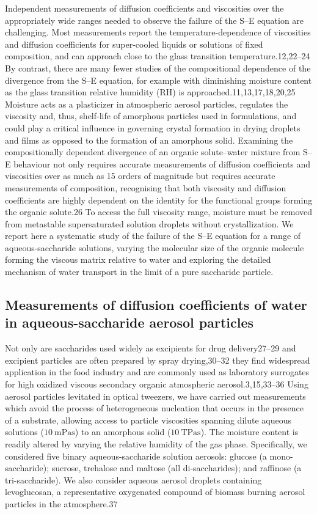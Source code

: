 Independent measurements of diffusion coefficients and viscosities over the appropriately wide ranges needed to observe the failure of the S–E equation are challenging. Most measurements report the temperature-dependence of viscosities and diffusion coefficients for super-cooled liquids or solutions of fixed composition, and can approach close to the glass transition temperature.12,22–24 By contrast, there are many fewer studies of the compositional dependence of the divergence from the S–E equation, for example with diminishing moisture content as the glass transition relative humidity (RH) is approached.11,13,17,18,20,25 Moisture acts as a plasticizer in atmospheric aerosol particles, regulates the viscosity and, thus, shelf-life of amorphous particles used in formulations, and could play a critical influence in governing crystal formation in drying droplets and films as opposed to the formation of an amorphous solid. Examining the compositionally dependent divergence of an organic solute–water mixture from S–E behaviour not only requires accurate measurements of diffusion coefficients and viscosities over as much as 15 orders of magnitude but requires accurate measurements of composition, recognising that both viscosity and diffusion coefficients are highly dependent on the identity for the functional groups forming the organic solute.26 To access the full viscosity range, moisture must be removed from metastable supersaturated solution droplets without crystallization. We report here a systematic study of the failure of the S–E equation for a range of aqueous-saccharide solutions, varying the molecular size of the organic molecule forming the viscous matrix relative to water and exploring the detailed mechanism of water transport in the limit of a pure saccharide particle.

\subsection{Measurements of diffusion coefficients of water in aqueous-saccharide aerosol particles}

Not only are saccharides used widely as excipients for drug delivery27–29 and excipient particles are often prepared by spray drying,30–32 they find widespread application in the food industry and are commonly used as laboratory surrogates for high oxidized viscous secondary organic atmospheric aerosol.3,15,33–36 Using aerosol particles levitated in optical tweezers, we have carried out measurements which avoid the process of heterogeneous nucleation that occurs in the presence of a substrate, allowing access to particle viscosities spanning dilute aqueous solutions ($\SI{10}{\milli\pascal\second}$) to an amorphous solid ($\SI{10}{\tera\pascal\second}$). The moisture content is readily altered by varying the relative humidity of the gas phase. Specifically, we considered five binary aqueous-saccharide solution aerosols: glucose (a mono-saccharide); sucrose, trehalose and maltose (all di-saccharides); and raffinose (a tri-saccharide). We also consider aqueous aerosol droplets containing levoglucosan, a representative oxygenated compound of biomass burning aerosol particles in the atmosphere.37

